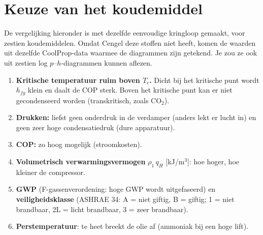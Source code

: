 \section{Keuze van het koudemiddel}
\label{s:koudemiddel}
De vergelijking hieronder is met dezelfde eenvoudige kringloop gemaakt, voor zestien koudemiddelen. Omdat Cengel deze
stoffen niet heeft, komen de waarden uit dezelfde CoolProp-data waarmee de diagrammen zijn getekend. Je zou ze ook
uit zestien log $p$–$h$-diagrammen kunnen aflezen.
\begin{enumerate}
\item \textbf{Kritische temperatuur ruim boven $T_c$.} Dicht bij het kritische punt wordt $h_{fg}$ klein en daalt de COP
      sterk. Boven het kritische punt kan er niet gecondenseerd worden (transkritisch, zoals CO$_2$).
\item \textbf{Drukken:} liefst geen onderdruk in de verdamper (anders lekt er lucht in) en geen zeer hoge condensatiedruk
      (dure apparatuur).
\item \textbf{COP:} zo hoog mogelijk (stroomkosten).
\item \textbf{Volumetrisch verwarmingsvermogen} $\rho_1\,q_H$ [kJ/m$^3$]: hoe hoger, hoe kleiner de compressor.
\item \textbf{GWP} (F-gassenverordening: hoge GWP wordt uitgefaseerd) en \textbf{veiligheidsklasse} (ASHRAE 34:
      A = niet giftig, B = giftig; 1 = niet brandbaar, 2L = licht brandbaar, 3 = zeer brandbaar).
\item \textbf{Perstemperatuur}: te heet breekt de olie af (ammoniak bij een hoge lift).
\end{enumerate}

